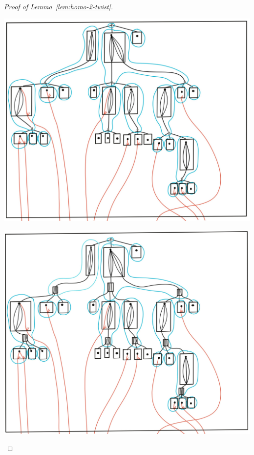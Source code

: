 \begin{proof}[Proof of Lemma~\ref{lem:homo-2-twist}]
\begin{center}
\includegraphics[scale=.07]{MyPic37.jpg}
\end{center} 
\begin{center}
\includegraphics[scale=.07]{MyPic38.jpg}
\end{center} 
\begin{center}

\end{center}
\end{proof}
